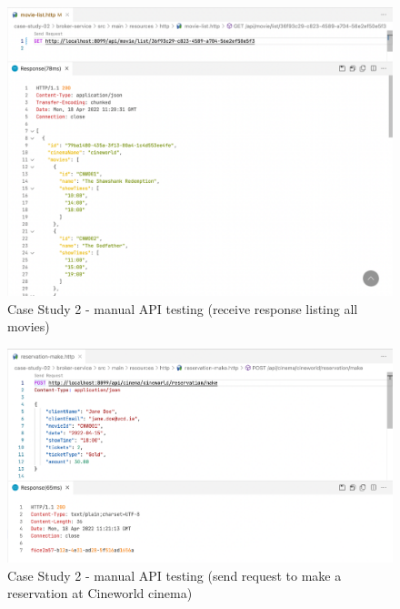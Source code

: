 \begin{figure}[H]
  \centering
  \includegraphics[width=1.0\linewidth]{./assets/images/case-studies/cs02-manual-2.png}
  \caption{Case Study 2 - manual API testing (receive response listing all movies)}
  \label{fig:cs02-manual-2}
\end{figure}

\begin{figure}[H]
  \centering
  \includegraphics[width=1.0\linewidth]{./assets/images/case-studies/cs02-manual-3.png}
  \caption{Case Study 2 - manual API testing (send request to make a reservation at Cineworld cinema)}
  \label{fig:cs02-manual-3}
\end{figure}

